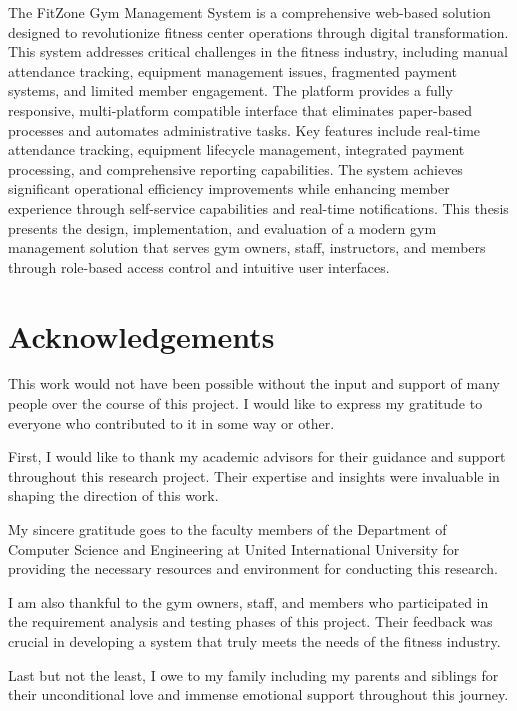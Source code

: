 \documentclass[12pt,a4paper]{report}
\begin{document}
The FitZone Gym Management System is a comprehensive web-based solution designed to revolutionize fitness center operations through digital transformation. This system addresses critical challenges in the fitness industry, including manual attendance tracking, equipment management issues, fragmented payment systems, and limited member engagement. The platform provides a fully responsive, multi-platform compatible interface that eliminates paper-based processes and automates administrative tasks. Key features include real-time attendance tracking, equipment lifecycle management, integrated payment processing, and comprehensive reporting capabilities. The system achieves significant operational efficiency improvements while enhancing member experience through self-service capabilities and real-time notifications. This thesis presents the design, implementation, and evaluation of a modern gym management solution that serves gym owners, staff, instructors, and members through role-based access control and intuitive user interfaces.

\newpage

\chapter*{Acknowledgements}

This work would not have been possible without the input and support of many people over the course of this project. I would like to express my gratitude to everyone who contributed to it in some way or other.

First, I would like to thank my academic advisors for their guidance and support throughout this research project. Their expertise and insights were invaluable in shaping the direction of this work.

My sincere gratitude goes to the faculty members of the Department of Computer Science and Engineering at United International University for providing the necessary resources and environment for conducting this research.

I am also thankful to the gym owners, staff, and members who participated in the requirement analysis and testing phases of this project. Their feedback was crucial in developing a system that truly meets the needs of the fitness industry.

Last but not the least, I owe to my family including my parents and siblings for their unconditional love and immense emotional support throughout this journey.
\end{document}
